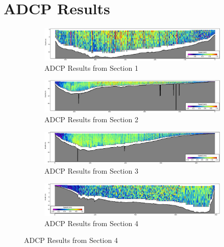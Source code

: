 \chapter{ADCP Results}
\label{appendix:fieldwork results}

\begin{figure}[H]
    \centering
    \begin{subfigure}{\linewidth}
        \includegraphics[width=\linewidth]{figures/appendix-h/section1.png}
        \caption{ADCP Results from Section 1}
        \label{fig:adcp_results_1}
    \end{subfigure}

    \begin{subfigure}{\linewidth}
        \includegraphics[width=\linewidth]{figures/appendix-h/section2.png}
        \caption{ADCP Results from Section 2}
        \label{fig:adcp_results_2}
    \end{subfigure}

    \begin{subfigure}{\linewidth}
        \includegraphics[width=\linewidth]{figures/appendix-h/section3.png}
        \caption{ADCP Results from Section 3}
        \label{fig:adcp_results_3}
    \end{subfigure}

    \begin{subfigure}{\linewidth}
        \includegraphics[width=\linewidth]{figures/appendix-h/section4.png}
        \caption{ADCP Results from Section 4}
        \label{fig:adcp_results_4}
    \end{subfigure}


\end{figure}
